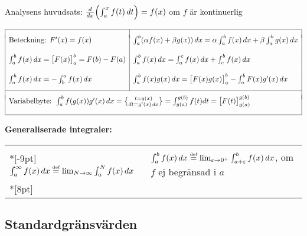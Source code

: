 \documentclass{article}
\begin{document}
Analysens huvudsats: 
$\frac d{dx}\Bigl(\int_a^x f(t)\,dt\Bigr)=f(x)$ om $f$ är
kontinuerlig


\medskip

$
\begin{array}{|l|l|}\hline   & \\*[-5pt] %
 
 \mbox{Beteckning: }F'(x) = f(x) & 
 \int_a^b (\alpha f(x)+\beta g(x))\,dx
 =\alpha\int_a^b f(x)\,dx
 +\beta\int_a^b g(x)\,dx \\
 & \\
 \int_a^b f(x)\,dx = \bigl[F(x)\bigr]_{a}^b = F(b)-F(a)& 
 \int_a^b f(x)\,dx = \int_a^c f(x)\,dx + \int_c^b f(x)\,dx\\
 & \\
 \int_a^b f(x)\,dx = -\int_b^a f(x)\,dx & 
 \int_a^b f(x)g(x)\,dx=\bigl[F(x)g(x)\bigr]_{a}^b-\int_a^b F(x)g'(x)\,dx
 \\*[9pt]
 \cline{1-2}
 \multicolumn{2}{|l|}{}\\*[-6pt]
 \multicolumn{2}{|l|}{
  \mbox{Variabelbyte: }
\int_a^b f(g(x))g'(x)\,dx=
\genfrac{\{}{\}}{0pt}{}{t=g(x)}{dt=g'(x)\,dx}
= \int_{g(a)}^{g(b)} f(t)dt = \bigl[F(t)\bigr]_{g(a)}^{g(b)} 
  } 
\\*[12pt]\hline
\end{array}
$

\medskip

\textbf{Generaliserade integraler:}\\ 
\begin{tabular}{|l|l|}
\hline & \\*[-9pt]
$\int_a^\infty f(x)\,dx 
 \stackrel{\mbox{\tiny def}}{=}
 \lim_{N\to\infty}\int_a^N f(x)\,dx$
&
$\int_a^b f(x)\,dx 
 \stackrel{\mbox{\tiny def}}{=}
 \lim_{\varepsilon\to0^+}\int_{a+\varepsilon}^b f(x)\,dx$, 
 om $f$ ej begränsad i $a$\\*[8pt]
\hline
\end{tabular}

\subsection*{Standardgränsvärden}%
\end{document}
